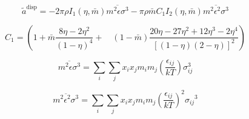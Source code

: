 \documentclass[12pt, letterpaper]{article}
\begin{document}
\begin{equation}
    \tilde{a}^{\mathrm{disp}}=-2 \pi \rho I_{1}(\eta, \bar{m}) \overline{m^2 \epsilon \sigma^3}-\pi \rho \bar{m} C_{1} I_{2}(\eta, \bar{m}) \overline{m^2 \epsilon^2 \sigma^3}
    \label{eq:ares_disp}
\end{equation}


\begin{equation}
    C_{1} = \left(1+\bar{m} \frac{8 \eta-2 \eta^2}{(1-\eta)^4}+\right.\left.\quad(1-\bar{m}) \frac{20 \eta-27 \eta^2+12 \eta^3-2 \eta^4}{[(1-\eta)(2-\eta)]^2}\right)
    \label{eq:c1_disp}
\end{equation}


\begin{equation}
    \overline{m^2 \epsilon \sigma^3}=\sum_{i} \sum_{j} x_{i} x_{j} m_{i} m_{j}\left(\frac{\epsilon_{i j}}{k T}\right) \sigma_{i j}^3
    \label{eq:m2epssigma3_bar}
\end{equation}


\begin{equation}
    \overline{m^2 \epsilon^2 \sigma^3}=\sum_{i} \sum_{j} x_{i} x_{j} m_{i} m_{j}\left(\frac{\epsilon_{i j}}{k T}\right)^2 \sigma_{i j}{ }^3
    \label{eq:m2eps2sigma3_bar}
\end{equation}

\end{document}
